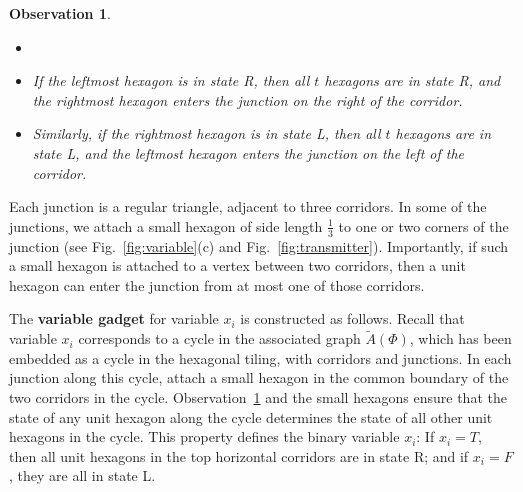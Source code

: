 \documentclass{article}
\theoremstyle{plain}%
\newtheorem{observation}{Observation}
\begin{document}
\begin{observation}\label{obs:corridor}
\begin{itemize}
\item[]
\item[(1)] If the leftmost hexagon is in state R, then all $t$ hexagons are in state R, and the rightmost hexagon enters the junction on the right of the corridor.
\item[(2)] Similarly, if the rightmost hexagon is in state L, then all $t$ hexagons are in state L, and the leftmost hexagon enters the junction on the left of the corridor.
\end{itemize}
\end{observation}

Each junction is a regular triangle, adjacent to three corridors. In some of the junctions, we attach a small hexagon of side length $\frac{1}{3}$ to one or two corners of the junction (see Fig.~\ref{fig:variable}(c) and Fig.~\ref{fig:transmitter}). Importantly, if such a small hexagon is attached to a vertex between two corridors, then a unit hexagon can enter the junction from at most one of those corridors.

The {\bf variable gadget} for variable $x_i$ is constructed as follows. Recall that variable $x_i$ corresponds to a cycle in the associated graph $\tilde{A}(\Phi)$, which has been embedded as a cycle in the hexagonal tiling, with corridors and junctions. In each junction along this cycle, attach a small hexagon in the common boundary of the two corridors in the cycle. Observation~\ref{obs:corridor} and the small hexagons ensure that the state of any unit hexagon along the cycle determines the state of all other unit hexagons in the cycle. This property defines the binary variable $x_i$: If $x_i=T$, then all unit hexagons in the top horizontal corridors are in state R; and if $x_i=F$, they are all in state L.
\end{document}
